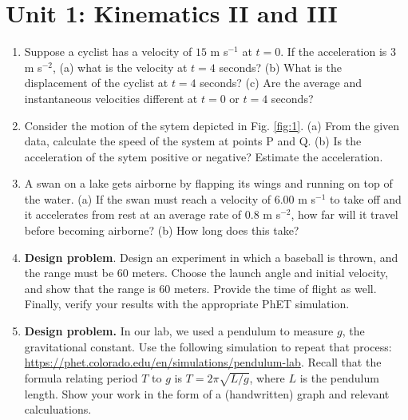 \documentclass[10pt]{article}
\begin{document}
\section{Unit 1: Kinematics II and III}

\begin{enumerate}
\item Suppose a cyclist has a velocity of $15$ m s$^{-1}$ at $t=0$.  If the acceleration is 3 m s$^{-2}$, (a) what is the velocity at $t = 4$ seconds? (b) What is the displacement of the cyclist at $t = 4$ seconds? (c) Are the average and instantaneous velocities different at $t=0$ or $t=4$ seconds?  \\ \vspace{3cm}
\item Consider the motion of the sytem depicted in Fig. \ref{fig:1}.  (a) From the given data, calculate the speed of the system at points P and Q. (b) Is the acceleration of the sytem positive or negative?  Estimate the acceleration. \\ \vspace{3cm}
\item A swan on a lake gets airborne by flapping its wings and running on top of the water. (a) If the swan must reach a velocity of 6.00 m s$^{-1}$ to take off and it accelerates from rest at an average rate of 0.8 m s$^{-2}$, how far will it travel before becoming airborne? (b) How long does this take? \\ \vspace{3cm}
\item \textbf{Design problem}.  Design an experiment in which a baseball is thrown, and the range must be 60 meters.  Choose the launch angle and initial velocity, and show that the range is 60 meters.  Provide the time of flight as well.  Finally, verify your results with the appropriate PhET simulation. \\ \vspace{3cm}
\item \textbf{Design problem.}  In our lab, we used a pendulum to measure $g$, the gravitational constant.  Use the following simulation to repeat that process: \url{https://phet.colorado.edu/en/simulations/pendulum-lab}. Recall that the formula relating period $T$ to $g$ is $T = 2\pi\sqrt{L/g}$, where $L$ is the pendulum length. Show your work in the form of a (handwritten) graph and relevant calculuations. \\ \vspace{4cm}
\end{enumerate}
\end{document}
